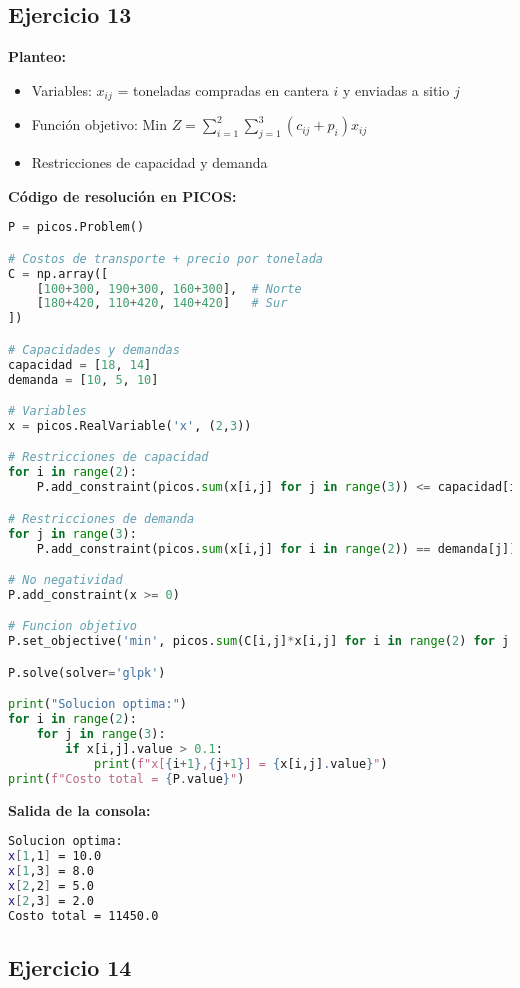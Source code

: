 \documentclass[12pt]{article}
\begin{document}
\subsection*{Ejercicio 13}

\textbf{Planteo:}
\begin{itemize}
\item Variables: $x_{ij}$ = toneladas compradas en cantera $i$ y enviadas a sitio $j$
\item Función objetivo: Min $Z = \sum_{i=1}^2 \sum_{j=1}^3 (c_{ij} + p_i)x_{ij}$
\item Restricciones de capacidad y demanda
\end{itemize}

\textbf{Código de resolución en PICOS:}
\begin{lstlisting}[language=Python]
P = picos.Problem()

# Costos de transporte + precio por tonelada
C = np.array([
    [100+300, 190+300, 160+300],  # Norte
    [180+420, 110+420, 140+420]   # Sur
])

# Capacidades y demandas
capacidad = [18, 14]
demanda = [10, 5, 10]

# Variables
x = picos.RealVariable('x', (2,3))

# Restricciones de capacidad
for i in range(2):
    P.add_constraint(picos.sum(x[i,j] for j in range(3)) <= capacidad[i])

# Restricciones de demanda
for j in range(3):
    P.add_constraint(picos.sum(x[i,j] for i in range(2)) == demanda[j])

# No negatividad
P.add_constraint(x >= 0)

# Funcion objetivo
P.set_objective('min', picos.sum(C[i,j]*x[i,j] for i in range(2) for j in range(3)))

P.solve(solver='glpk')

print("Solucion optima:")
for i in range(2):
    for j in range(3):
        if x[i,j].value > 0.1:
            print(f"x[{i+1},{j+1}] = {x[i,j].value}")
print(f"Costo total = {P.value}")
\end{lstlisting}

\textbf{Salida de la consola:}
\begin{lstlisting}[language=bash,backgroundcolor=\color{black},basicstyle=\color{white}\ttfamily,numbers=none]
Solucion optima:
x[1,1] = 10.0
x[1,3] = 8.0
x[2,2] = 5.0
x[2,3] = 2.0
Costo total = 11450.0
\end{lstlisting}

\subsection*{Ejercicio 14}
\end{document}

